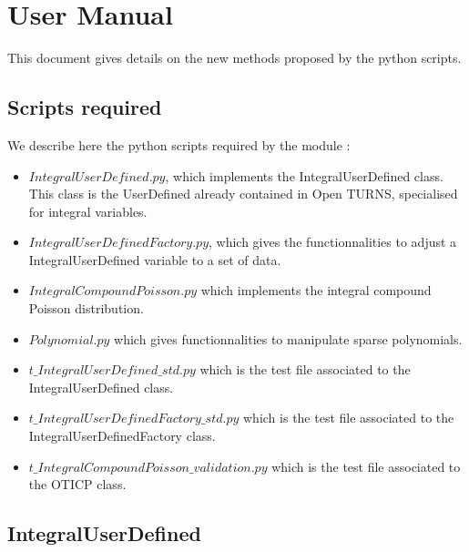 % 

\section{User Manual}

This document gives details on the new methods proposed by the python scripts. 



\subsection{Scripts required}

We describe here the python scripts required by the module : 
\begin{itemize}
  \item $IntegralUserDefined.py$, which implements the IntegralUserDefined class. This class is the UserDefined already contained in Open TURNS, specialised for integral variables.
  \item $IntegralUserDefinedFactory.py$, which gives the functionnalities to adjust a IntegralUserDefined variable to a set of data.
  \item $IntegralCompoundPoisson.py$ which implements the integral compound Poisson distribution.
  \item $Polynomial.py$ which gives functionnalities to manipulate sparse polynomials.
  \item $t\_IntegralUserDefined\_std.py$ which is the test file associated to the IntegralUserDefined class.
  \item $t\_IntegralUserDefinedFactory\_std.py$ which is the test file associated to the IntegralUserDefinedFactory class.
  \item $t\_IntegralCompoundPoisson\_validation.py$ which is the test file associated to the OTICP class.
\end{itemize}


\subsection{IntegralUserDefined}

